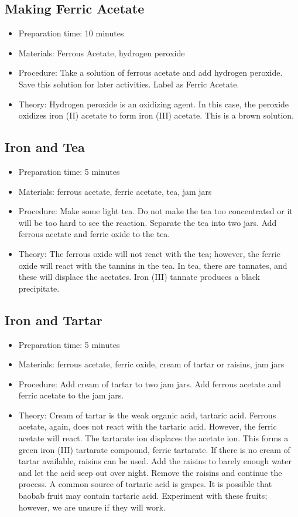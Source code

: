 \subsection{Making Ferric Acetate}
\begin{itemize}
\item{Preparation time: 10 minutes}
\item{Materials: Ferrous Acetate, hydrogen peroxide}
\item{Procedure: Take a solution of ferrous acetate and add hydrogen peroxide. Save this solution for later activities. Label as Ferric Acetate.}
\item{Theory: Hydrogen peroxide is an oxidizing agent. In this case, the peroxide oxidizes iron (II) acetate to form iron (III) acetate. This is a brown solution.}
\end{itemize}

\subsection{Iron and Tea}
\begin{itemize}
\item{Preparation time: 5 minutes}
\item{Materials: ferrous acetate, ferric acetate, tea, jam jars}
\item{Procedure: Make some light tea. Do not make the tea too concentrated or it will be too hard to see the reaction. Separate the tea into two jars. Add ferrous acetate and ferric oxide to the tea.}
\item{Theory: The ferrous oxide will not react with the tea; however, the ferric oxide will react with the tannins in the tea. In tea, there are tannates, and these will displace the acetates. Iron (III) tannate produces a black precipitate.}
\end{itemize}

\subsection{Iron and Tartar}
\begin{itemize}
\item{Preparation time: 5 minutes}
\item{Materials: ferrous acetate, ferric oxide, cream of tartar or raisins, jam jars}
\item{Procedure: Add cream of tartar to two jam jars. Add ferrous acetate and ferric acetate to the jam jars.}
\item{Theory: Cream of tartar is the weak organic acid, tartaric acid. Ferrous acetate, again, does not react with the tartaric acid. However, the ferric acetate will react. The tartarate ion displaces the acetate ion. This forms a green iron (III) tartarate compound, ferric tartarate. If there is no cream of tartar available, raisins can be used. Add the raisins to barely enough water and let the acid seep out over night. Remove the raisins and continue the process. A common source of tartaric acid is grapes. It is possible that baobab fruit may contain tartaric acid. Experiment with these fruits; however, we are unsure if they will work.}
\end{itemize}


